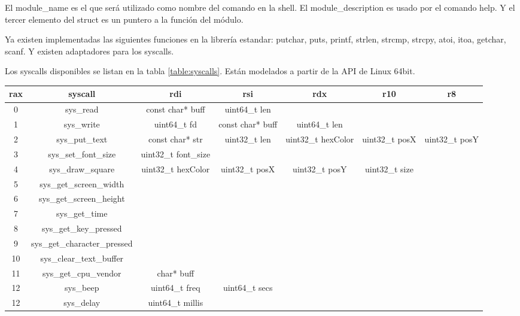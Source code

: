 \documentclass{article}
\begin{document}
El module\_name es el que será utilizado como nombre del comando en la shell. El module\_description es usado por el comando help. Y el tercer elemento del struct es un puntero a la función del módulo.

Ya existen implementadas las siguientes funciones en la librería estandar: putchar, puts, printf, strlen, strcmp, strcpy, atoi, itoa, getchar, scanf. Y existen adaptadores para los syscalls.

Los syscalls disponibles se listan en la tabla \ref{table:syscalls}. Están modelados a partir de la API de Linux 64bit.

\begin{center}
\hspace*{-0.85in}
\begin{tabular}{|c|c|c|c|c|c|c|}
\hline
\textbf{rax} & \textbf{syscall} & \textbf{rdi} & \textbf{rsi} & \textbf{rdx} & \textbf{r10} & \textbf{r8} \\ \hline
0 & sys\_read &  const char* buff & uint64\_t len & & & \\ \hline
1 & sys\_write & uint64\_t fd & const char* buff & uint64\_t len & &  \\ \hline
2 & sys\_put\_text & const char* str & uint32\_t len & uint32\_t hexColor & uint32\_t posX & uint32\_t posY \\ \hline
3 & sys\_set\_font\_size & uint32\_t font\_size & & & &  \\ \hline
4 & sys\_draw\_square & uint32\_t hexColor & uint32\_t posX & uint32\_t posY & uint32\_t size &  \\ \hline
5 & sys\_get\_screen\_width & & & & & \\ \hline
6 & sys\_get\_screen\_height & & & & &   \\ \hline
7 & sys\_get\_time & & & & &   \\ \hline
8 & sys\_get\_key\_pressed & & & & &   \\ \hline
9 & sys\_get\_character\_pressed & & & & &   \\ \hline
10 & sys\_clear\_text\_buffer & & & & &   \\ \hline
11 & sys\_get\_cpu\_vendor & char* buff & & & &   \\ \hline
12 & sys\_beep & uint64\_t freq & uint64\_t secs & & &  \\ \hline
12 & sys\_delay & uint64\_t millis & & & &  \\ \hline
\end{tabular}
\label{table:syscalls}
\end{center}
\end{document}
